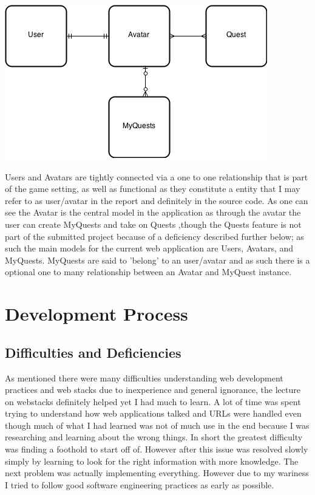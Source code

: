 \documentclass[11pt,a4paper]{article}
\begin{document}
\begin{center}
\includegraphics[scale=0.5]{selpModels.png} \\
\end{center}

Users and Avatars are tightly connected via a one to one relationship that is part of the game setting, as well as functional as they constitute a entity that I may refer to as user/avatar in the report and definitely in the source code. As one can see the Avatar is the central model in the application as through the avatar the user can create MyQuests and take on Quests ,though the Quests feature is not part of the submitted project because of a deficiency described further below; as such the main models for the current web application are Users, Avatars, and MyQuests. MyQuests are said to 'belong' to an user/avatar and as such there is a optional one to many relationship between an Avatar and MyQuest instance.

\section{Development Process}
\subsection{Difficulties and Deficiencies}
As mentioned there were many difficulties understanding web development practices and web stacks due to inexperience and general ignorance, the lecture on webstacks definitely helped yet I had much to learn. A lot of time was spent trying to understand how web applications talked and URLs were handled even though much of what I had learned was not of much use in the end because I was researching and learning about the wrong things. In short the greatest difficulty was finding a foothold to start off of. However after this issue was resolved slowly simply by learning to look for the right information with more knowledge. The next problem was actually implementing everything. However due to my wariness I tried to follow good software engineering practices as early as possible.
\end{document}
